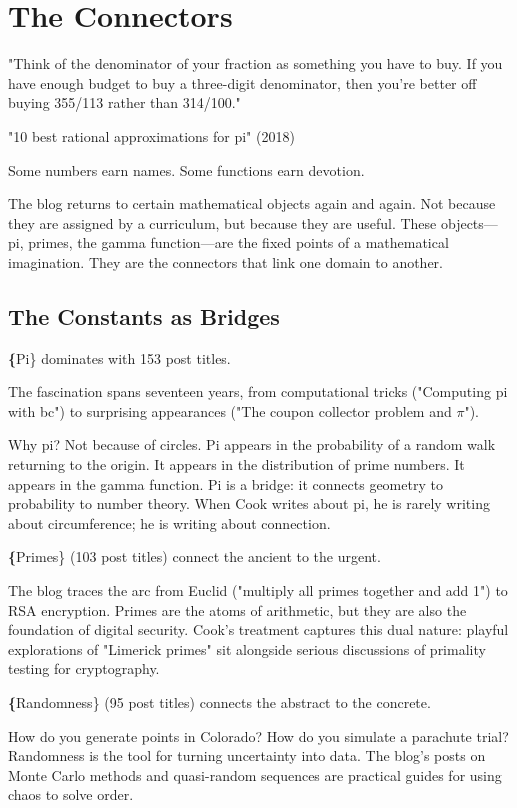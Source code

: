 \chapter{The Connectors}

\epigraph{"Think of the denominator of your fraction as something you have to buy. If you have enough budget to buy a three-digit denominator, then you're better off buying 355/113 rather than 314/100."}{"10 best rational approximations for pi" (2018)}

\bigskip

Some numbers earn names. Some functions earn devotion.

The blog returns to certain mathematical objects again and again. Not because they are assigned by a curriculum, but because they are useful. These objects—pi, primes, the gamma function—are the fixed points of a mathematical imagination. They are the connectors that link one domain to another.

\bigskip

\section*{The Constants as Bridges}

\textbf\{Pi\} dominates with 153 post titles.

The fascination spans seventeen years, from computational tricks ("Computing pi with bc") to surprising appearances ("The coupon collector problem and $\pi$").

Why pi? Not because of circles. Pi appears in the probability of a random walk returning to the origin. It appears in the distribution of prime numbers. It appears in the gamma function. Pi is a bridge: it connects geometry to probability to number theory. When Cook writes about pi, he is rarely writing about circumference; he is writing about connection.

\textbf\{Primes\} (103 post titles) connect the ancient to the urgent.

The blog traces the arc from Euclid ("multiply all primes together and add 1") to RSA encryption. Primes are the atoms of arithmetic, but they are also the foundation of digital security. Cook's treatment captures this dual nature: playful explorations of "Limerick primes" sit alongside serious discussions of primality testing for cryptography.

\textbf\{Randomness\} (95 post titles) connects the abstract to the concrete.

How do you generate points in Colorado? How do you simulate a parachute trial? Randomness is the tool for turning uncertainty into data. The blog's posts on Monte Carlo methods and quasi-random sequences are practical guides for using chaos to solve order.

